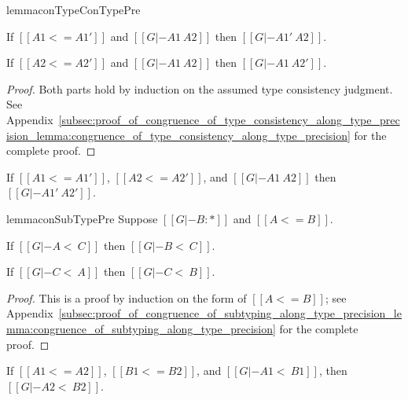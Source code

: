 \begin{restatable}{lemma}{conTypeConTypePre}
  \label{lemma:congruence_of_type_consistency_along_type_precision}
  \vspace{-15px}
  \begin{enumR}
  \item If $[[A1 <= A1']]$ and $[[G |- A1 ~ A2]]$ then
    $[[G |- A1' ~ A2]]$.
    
  \item If $[[A2 <= A2']]$ and $[[G |- A1 ~ A2]]$ then
    $[[G |- A1 ~ A2']]$.  
  \end{enumR}  
\end{restatable}
\begin{proof}
  Both parts hold by induction on the assumed type consistency
  judgment.  See
  Appendix~\ref{subsec:proof_of_congruence_of_type_consistency_along_type_precision_lemma:congruence_of_type_consistency_along_type_precision}
  for the complete proof.
\end{proof}

\begin{corollary}
  \label{corollary:congruence_of_type_consistency_along_type_precision}
  If $[[A1 <= A1']]$, $[[A2 <= A2']]$, and $[[G |- A1 ~ A2]]$ then
  $[[G |- A1' ~ A2']]$.  
\end{corollary}

\begin{restatable}{lemma}{conSubTypePre}
\label{lemma:congruence_of_subtyping_along_type_precision}
  Suppose $[[G |- B : *]]$ and $[[A <= B]]$.
  \begin{enumR}
  \item If $[[G |- A <~ C]]$ then $[[G |- B <~ C]]$.

  \item If $[[G |- C <~ A]]$ then $[[G |- C <~ B]]$.  
  \end{enumR}  
\end{restatable}
\begin{proof}
  This is a proof by induction on the form of $[[A <= B]]$; see
  Appendix~\ref{subsec:proof_of_congruence_of_subtyping_along_type_precision_lemma:congruence_of_subtyping_along_type_precision}
  for the complete proof.
\end{proof}

\begin{corollary}
  \label{corollary:congruence_of_subtyping_along_type_precision}
  If $[[A1 <= A2]]$, $[[B1 <= B2]]$, and $[[G |- A1 <~ B1]]$, then $[[G |- A2 <~ B2]]$.
\end{corollary}

